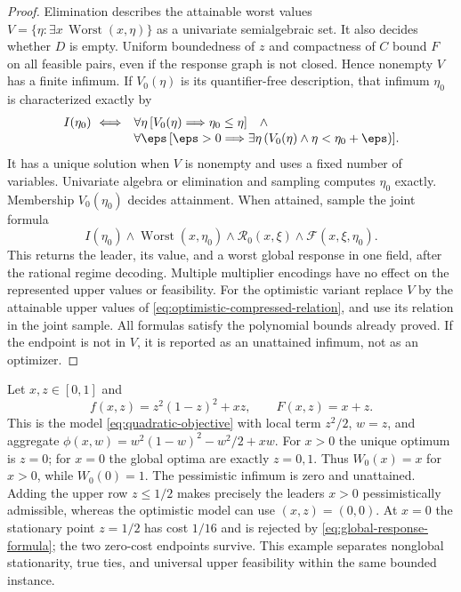 \begin{proof}
Elimination describes the attainable worst values
$V=\{\eta:\exists x\,\operatorname{Worst}(x,\eta)\}$ as a univariate
semialgebraic set. It also decides whether $D$ is empty. Uniform boundedness
of $z$ and compactness of $C$ bound $F$ on all feasible pairs, even if
the response graph is not closed. Hence nonempty $V$ has a finite
infimum. If $V_0(\eta)$ is its quantifier-free description, that
infimum $\eta_0$ is characterized exactly by
\begin{equation}\label{eq:infimum-predicate}
 \begin{split}
 I(\eta_0)\ \Longleftrightarrow\quad&
 \forall\eta\,[V_0(\eta)\Longrightarrow\eta_0\le\eta]\quad\wedge\\[-2pt]
 &\forall\eps\,[\eps>0\Longrightarrow
            \exists\eta\,(V_0(\eta)\wedge\eta<\eta_0+\eps)].
 \end{split}
\end{equation}
It has a unique solution when $V$ is nonempty and uses a fixed number
of variables. Univariate algebra or elimination and sampling computes
$\eta_0$ exactly. Membership $V_0(\eta_0)$ decides attainment.
When attained, sample the joint formula
\[
 I(\eta_0)\wedge\operatorname{Worst}(x,\eta_0)
       \wedge\mathcal R_0(x,\xi)\wedge\mathcal F(x,\xi,\eta_0).
\]
This returns the leader, its value, and a worst global response in one
field, after the rational regime decoding. Multiple multiplier
encodings have no effect on the represented upper values or feasibility.
For the optimistic variant replace $V$ by the attainable upper values
of \eqref{eq:optimistic-compressed-relation}, and use its relation in
the joint sample. All formulas satisfy the polynomial bounds already
proved. If the endpoint is not in $V$, it is reported as an unattained
infimum, not as an optimizer.
\end{proof}

\begin{example}\label{ex:pessimistic-nonattainment}
Let $x,z\in[0,1]$ and
\[
             f(x,z)=z^2(1-z)^2+xz,\qquad F(x,z)=x+z.
\]
This is the model \eqref{eq:quadratic-objective} with local term $z^2/2$,
$w=z$, and aggregate
$\phi(x,w)=w^2(1-w)^2-w^2/2+xw$.
For $x>0$ the unique optimum is $z=0$; for $x=0$ the global optima
are exactly $z=0,1$. Thus $W_0(x)=x$ for $x>0$, while $W_0(0)=1$.
The pessimistic infimum is zero and unattained. Adding the upper row
$z\le1/2$ makes precisely the leaders $x>0$ pessimistically admissible,
whereas the optimistic model can use $(x,z)=(0,0)$. At $x=0$ the
stationary point $z=1/2$ has cost $1/16$ and is rejected by
\eqref{eq:global-response-formula}; the two zero-cost endpoints survive.
This example separates nonglobal stationarity, true ties, and universal
upper feasibility within the same bounded instance.
\end{example}

